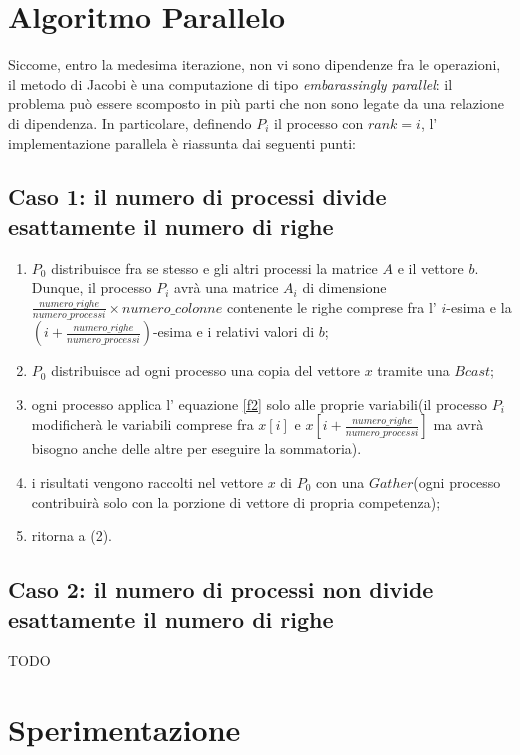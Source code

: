 \documentclass[twocolumn]{article}
\begin{document}
	\section{Algoritmo Parallelo}
	Siccome, entro la medesima iterazione, non vi sono dipendenze fra le operazioni, il metodo di Jacobi è  una computazione di tipo \textit{embarassingly parallel}: il problema può essere scomposto in più parti che non sono legate da una relazione di dipendenza. In particolare, definendo $P_i$ il processo con $rank = i$, l' implementazione parallela è riassunta dai seguenti punti:
	\subsection{Caso 1: il numero di processi divide esattamente il numero di righe}
	\begin{enumerate}
		\item $P_0$ distribuisce fra se stesso e gli altri processi la matrice $A$ e il vettore $b$. Dunque, il processo $P_i$ avrà una matrice $A_i$ di dimensione $\frac{numero\_righe}{numero\_processi} \times numero\_colonne$ contenente le righe comprese fra  l' $i$-esima e la $(i + \frac{numero\_righe}{numero\_processi})$-esima e i relativi valori di $b$;
		\item $P_0$ distribuisce ad ogni processo una copia del vettore $x$ tramite una $Bcast$;
		\item ogni processo applica l' equazione \eqref{f2} solo alle proprie variabili(il processo $P_i$ modificherà le variabili comprese fra $x[i]$ e $x[i + \frac{numero\_righe}{numero\_processi}]$ ma avrà bisogno anche delle altre per eseguire la sommatoria).
		\item i risultati vengono raccolti nel vettore $x$ di $P_0$ con una $Gather$(ogni processo contribuirà solo con la porzione di vettore di propria competenza);
		\item ritorna a (2).
	\end{enumerate}
   \subsection{Caso 2: il numero di processi non divide esattamente il numero di righe}
   TODO
   
	
	\section{Sperimentazione}
	
\end{document}
